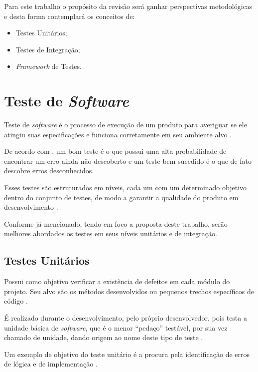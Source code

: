 \vfill
\pagebreak

    Para este trabalho o propósito da revisão será ganhar perspectivas metodológicas e desta forma contemplará os conceitos de:

    \begin{itemize}

        \item Testes Unitários;
        \item Testes de Integração;
        \item \textit{Framework} de Testes.

    \end{itemize}


\section{Teste de \textit{Software}}
    Teste de \textit{software} é o processo de execução de um produto para averiguar se ele atingiu suas especificações e funciona corretamente em seu ambiente alvo \cite{artigo_intro_teste}.

    De acordo com , um bom teste é o que possui uma alta probabilidade de encontrar um erro ainda não descoberto e um teste bem sucedido é o que de fato descobre erros desconhecidos.

    Esses testes são estruturados em níveis, cada um com um determinado objetivo dentro do conjunto de testes, de modo a garantir a qualidade do produto em desenvolvimento \cite{sw_test_tech}.

    Conforme já mencionado, tendo em foco a proposta deste trabalho, serão melhores abordados os testes em seus níveis unitários e de integração.

    \subsection{Testes Unitários}
        Possui como objetivo verificar a existência de defeitos em cada módulo do projeto. Seu alvo são os métodos desenvolvidos ou pequenos trechos específicos de código \cite{artigo_intro_teste}.
        
        É realizado durante o desenvolvimento, pelo próprio desenvolvedor, pois testa a unidade básica de \textit{software}, que é o menor ``pedaço''  testável, por sua vez chamado de unidade, dando origem ao nome deste tipo de teste \cite{sw_test_tech}.
        
        Um exemplo de objetivo do teste unitário é a procura pela identificação de erros de lógica e de implementação \cite{maldonado}.


